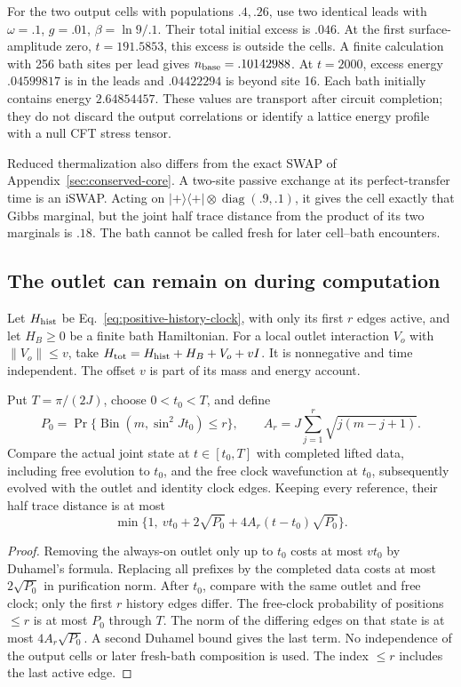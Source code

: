 For the two output cells with populations $.4,.26$, use two identical
leads with $\omega=.1$, $g=.01$, $\beta=\ln9/.1$.
Their total initial excess is $.046$. At the first surface-amplitude
zero, $t=191.5853$, this excess is outside the cells. A finite calculation
with 256 bath sites per lead gives $n_{\rm base}=.10142988$.
At $t=2000$, excess energy $.04599817$ is in the leads and $.04422294$
is beyond site 16. Each bath initially contains energy $2.64854457$.
These values are transport after circuit completion; they do not discard
the output correlations or identify a lattice energy profile with a null
CFT stress tensor.

Reduced thermalization also differs from the exact SWAP of
Appendix~\ref{sec:conserved-core}. A two-site passive exchange at its
perfect-transfer time is an iSWAP. Acting on $|+\rangle\langle+|\otimes
\operatorname{diag}(.9,.1)$, it gives the cell exactly that Gibbs marginal,
but the joint half trace distance from the product of its two marginals
is $.18$. The bath cannot be called fresh for later cell--bath encounters.

\subsection{The outlet can remain on during computation}

Let $H_{\rm hist}$ be Eq.~\eqref{eq:positive-history-clock}, with only its
first $r$ edges active, and let $H_B\ge0$ be a finite bath Hamiltonian.
For a local outlet interaction $V_o$ with $\|V_o\|\le v$, take
$H_{\rm tot}=H_{\rm hist}+H_B+V_o+vI$.
It is nonnegative and time independent. The offset $v$ is part of its
mass and energy account.

\begin{proposition}
\label{prop:autonomous-outlet}
Put $T=\pi/(2J)$, choose $0<t_0<T$, and define
\[
 P_0=\Pr\{\operatorname{Bin}(m,\sin^2 Jt_0)\le r\},\qquad
 A_r=J\sum_{j=1}^r\sqrt{j(m-j+1)}.
\]
Compare the actual joint state at $t\in[t_0,T]$ with completed lifted
data, including free evolution to $t_0$, and the free clock wavefunction
at $t_0$, subsequently evolved with the outlet and identity clock edges.
Keeping every reference, their half trace distance is at most
\begin{equation}\label{eq:autonomous-outlet-bound}
 \min\{1,\ vt_0+2\sqrt{P_0}+4A_r(t-t_0)\sqrt{P_0}\}.
\end{equation}
\end{proposition}
\begin{proof}
Removing the always-on outlet only up to $t_0$ costs at most $vt_0$ by
Duhamel's formula. Replacing all prefixes by the completed data costs
at most $2\sqrt{P_0}$ in purification norm. After $t_0$, compare with
the same outlet and free clock; only the first $r$ history edges differ.
The free-clock probability of positions $\le r$ is at most $P_0$ through
$T$. The norm of the differing edges on that state is at most
$4A_r\sqrt{P_0}$. A second Duhamel bound gives the last term.
No independence of the output cells or later fresh-bath composition is
used. The index $\le r$ includes the last active edge.
\end{proof}

